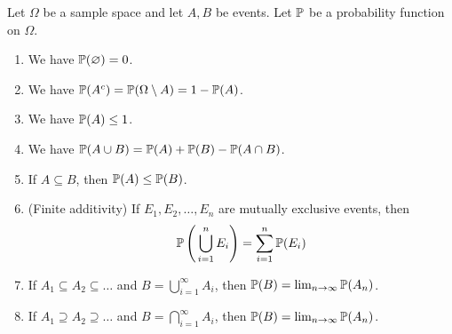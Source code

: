 \begin{proposition} \label{prop:properties}
  Let $\Omega$ be a sample space and let $A, B$ be events. Let $\operatorname{\mathbb{P}}$ be a probability function on $\Omega$.
  \begin{enumerate}
    \item We have $\operatorname{\mathbb{P}}(\varnothing) = 0$.
    \item We have $\operatorname{\mathbb{P}}(A^{c}) = \operatorname{\mathbb{P}}(\Omega \setminus A) = 1 - \operatorname{\mathbb{P}}(A)$.
    \item We have $\operatorname{\mathbb{P}}(A) \le 1$.
    \item We have $\operatorname{\mathbb{P}}(A \cup B) = \operatorname{\mathbb{P}}(A) + \operatorname{\mathbb{P}}(B) - \operatorname{\mathbb{P}}(A \cap B)$.
    \item If $A \subseteq B$, then $\operatorname{\mathbb{P}}(A) \le \operatorname{\mathbb{P}}(B)$.
    \item (Finite additivity) If $E_1, E_2, \dots, E_n$ are mutually exclusive events, then \[
      \operatorname{\mathbb{P}} \left(\, \bigcup_{i = 1}^{n} E_i \right) = \sum_{i = 1}^{n} \operatorname{\mathbb{P}}(E_i)\]
    \item If $A_1 \subseteq A_2 \subseteq \dots$ and $B = \bigcup_{i = 1}^{\infty} A_i$, then $\operatorname{\mathbb{P}}(B) = \lim_{n \to \infty} \operatorname{\mathbb{P}}(A_n)$.
    \item If $A_1 \supseteq A_2 \supseteq \dots$ and $B = \bigcap_{i = 1}^{\infty} A_i$, then $\operatorname{\mathbb{P}}(B) = \lim_{n \to \infty} \operatorname{\mathbb{P}}(A_n)$.
  \end{enumerate}
\end{proposition}
